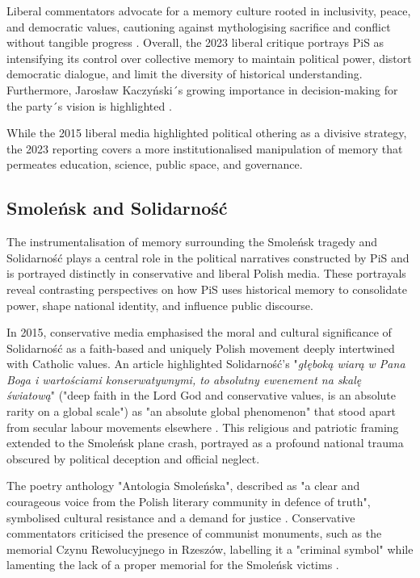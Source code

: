 Liberal commentators advocate for a memory culture rooted in inclusivity, peace, and democratic values, cautioning against mythologising sacrifice and conflict without tangible progress \citep{liliental_przerazmnie_2023}. Overall, the 2023 liberal critique portrays PiS as intensifying its control over collective memory to maintain political power, distort democratic dialogue, and limit the diversity of historical understanding. Furthermore, Jarosław Kaczyński´s growing importance in decision-making for the party´s vision is highlighted \citep{okopress2023lists}. 

While the 2015 liberal media highlighted political othering as a divisive strategy, the 2023 reporting covers a more institutionalised manipulation of memory that permeates education, science, public space, and governance.


\subsection{Smoleńsk and Solidarność}

The instrumentalisation of memory surrounding the Smoleńsk tragedy and Solidarność plays a central role in the political narratives constructed by PiS and is portrayed distinctly in conservative and liberal Polish media. These portrayals reveal contrasting perspectives on how PiS uses historical memory to consolidate power, shape national identity, and influence public discourse.

In 2015, conservative media emphasised the moral and cultural significance of Solidarność as a faith-based and uniquely Polish movement deeply intertwined with Catholic values. An article highlighted Solidarność’s "\textit{głęboką wiarą w Pana Boga i wartościami konserwatywnymi, to absolutny ewenement na skalę światową}" ("deep faith in the Lord God and conservative values, is an absolute rarity on a global scale") \citep{wpolityce_solidarnosc_2015} as "an absolute global phenomenon" that stood apart from secular labour movements elsewhere \citep{wpolityce_solidarnosc_2015}. This religious and patriotic framing extended to the Smoleńsk plane crash, portrayed as a profound national trauma obscured by political deception and official neglect.

The poetry anthology "Antologia Smoleńska", described as "a clear and courageous voice from the Polish literary community in defence of truth", symbolised cultural resistance and a demand for justice \citep{wpolityce_antologia_2015}. Conservative commentators criticised the presence of communist monuments, such as the memorial Czynu Rewolucyjnego in Rzeszów, labelling it a "criminal symbol" while lamenting the lack of a proper memorial for the Smoleńsk victims \citep{wpolityce_historyk_2015}.

